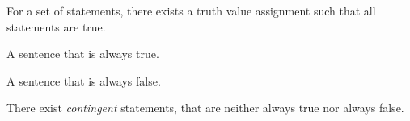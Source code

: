 \begin{definition}[Consistent]
For a set of statements, there exists a truth value assignment such that all statements are true.
\end{definition}
\begin{definition}[Tautology]
A sentence that is always true.
\end{definition}
\begin{definition}[Contradiction]
A sentence that is always false.
\end{definition}
\noindent There exist \textit{contingent} statements, that are neither always true nor always false.

